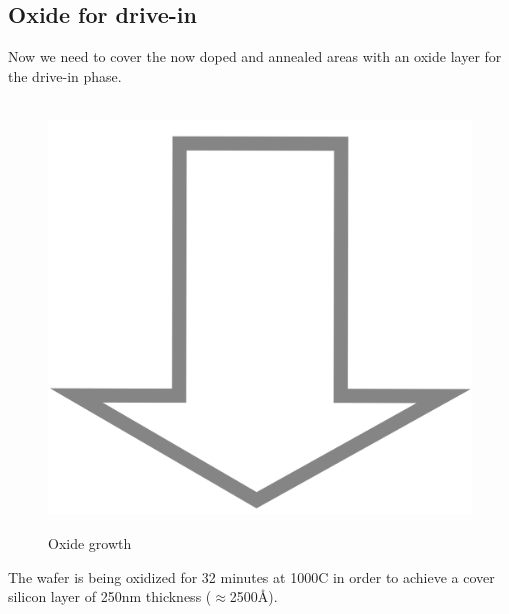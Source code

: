 \subsection{Oxide for drive-in}
Now we need to cover the now doped and annealed areas with an oxide layer for the drive-in phase.
\begin{figure}[H]
	\centering
	\begin{tikzpicture}[node distance = 3cm, auto, thick,scale=\CrossSectionOnly, every node/.style={transform shape}]
		
	\end{tikzpicture} \\
	\includegraphics[scale=0.01]{down_arrow.png} \\
	\begin{tikzpicture}[node distance = 3cm, auto, thick,scale=\CrossSectionOnly, every node/.style={transform shape}]
		
	\end{tikzpicture}
	\caption{Oxide growth}
\end{figure}
The wafer is being oxidized for 32 minutes at 1000\degree C in order to achieve a cover silicon layer of 250nm thickness ($\approx$2500\normalfont\AA).

